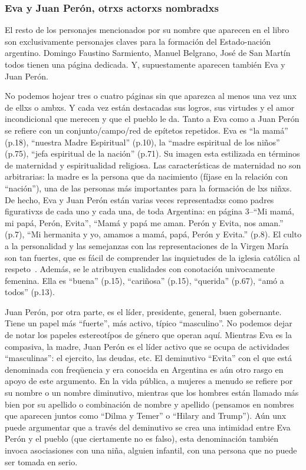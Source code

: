 \documentclass[
10pt, %
a4paper, %
oneside, %
headinclude,footinclude, %
]{scrartcl}
\begin{document}
\subsubsection{Eva y Juan Perón, otrxs actorxs nombradxs}
El resto de los personajes mencionados por su nombre que aparecen en el libro son exclusivamente personajes claves para la formación del Estado-nación argentino.
Domingo Faustino Sarmiento, Manuel Belgrano, José de San Martín todos tienen una página dedicada.
Y, supuestamente aparecen también Eva y Juan Perón.

No podemos hojear tres o cuatro páginas sin que aparezca al menos una vez unx de ellxs o ambxs.
Y cada vez están destacadas sus logros, sus virtudes y el amor incondicional que merecen y que el pueblo le da.
Tanto a Eva como a Juan Perón se refiere con un conjunto/campo/red de epítetos repetidos.
Eva es ``la mamá'' (p.18), ``nuestra Madre Espiritual'' (p.10), la ``madre espiritual de los niños'' (p.75), ``jefa espiritual de la nación'' (p.71).
Su imagen esta estilizada en términos de maternidad y espiritualidad religiosa.
Las características de maternidad no son arbitrarias: la madre es la persona que da nacimiento (fíjase en la relación con ``nación''), una de las personas más importantes para la formación de lxs niñxs.
De hecho, Eva y Juan Perón están varias veces representadxs como padres figurativxs de cada uno y cada una, de toda Argentina:
en página 3--``Mi mamá, mi papá, Perón, Evita'', ``Mamá y papá me aman. Perón y Evita, nos aman.'' (p.7), ``Mi hermanita y yo, amamos a mamá, papá, Perón y Evita.'' (p.8).
El culto a la personalidad y las semejanzas con las representaciones de la Virgen María son tan fuertes, que es fácil de comprender las inquietudes de la iglesia católica al respeto~\autocite{Chamosa2010}.
Además, se le atribuyen cualidades con conotación univocamente femenina.
Ella es ``buena'' (p.15), ``cariñosa'' (p.15), ``querida'' (p.67), ``amó a todos'' (p.13).

Juan Perón, por otra parte, es el líder, presidente, general, buen gobernante.
Tiene un papel más ``fuerte'', más activo, típico ``masculino''.
No podemos dejar de notar los papeles estereotípos de género que operan aquí.
Mientras Eva es la compasiva, la madre, Juan Perón es el líder activo que se ocupa de actividades ``masculinas'': el ejercito, las deudas, etc.
El deminutivo ``Evita'' con el que está denominada con freqüencia y era conocida en Argentina es aún otro rasgo en apoyo de este argumento.
En la vida pública, a mujeres a menudo se refiere por su nombre o un nombre diminutivo, mientras que los hombres están llamado más bien por su apellido o combinación de nombre y apellido (pensamos en nombres que aparecen juntos como ``Dilma y Temer'' o ``Hilary and Trump'').
Aún unx puede argumentar que a través del deminutivo se crea una intimidad entre Eva Perón y el pueblo (que ciertamente no es falso),
esta denominación también invoca asociasiones con una niña, alguien infantil, con una persona que no puede ser tomada en serio.
\end{document}
